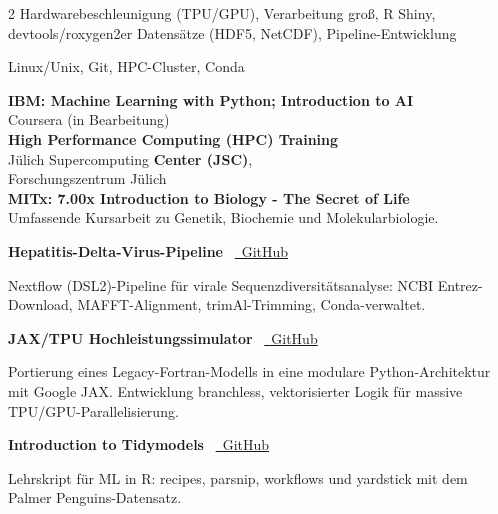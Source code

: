 \documentclass{thejus_cv}
\begin{document}
\begin{paracol}{2}
         {Hardwarebeschleunigung (TPU/GPU), Verarbeitung gro{\ss, R Shiny, devtools/roxygen2}er Datens\"atze (HDF5, NetCDF), Pipeline-Entwicklung}

         {Linux/Unix, Git, HPC-Cluster, Conda}



\textbf{IBM: Machine Learning with Python; Introduction to AI}\\
{\small Coursera (in Bearbeitung)}\\[0.3cm]

\textbf{High Performance Computing (HPC) Training}\\
J\"ulich Supercomputing \textbf{Center (JSC)},\\
Forschungszentrum J\"ulich\\[0.3cm]

\textbf{MITx: 7.00x Introduction to Biology - The Secret of Life}\\
{\small Umfassende Kursarbeit zu Genetik, Biochemie und Molekularbiologie.}\\[0.4cm]


\textbf{Hepatitis-Delta-Virus-Pipeline} \textbullet\ \href{https://github.com/thejusmahajan/hepatitis-delta-pipeline}{\faGithub\ GitHub}\par
{\small Nextflow (DSL2)-Pipeline f\"ur virale Sequenzdiversit\"atsanalyse: NCBI Entrez-Download, MAFFT-Alignment, trimAl-Trimming, Conda-verwaltet.}\par
\vspace{0.3em}

\textbf{JAX/TPU Hochleistungssimulator} \textbullet\ \href{https://github.com/thejusmahajan/Agent_Based_Phytoplankton_Model-IBM-Phytoplankton}{\faGithub\ GitHub}\par
{\small Portierung eines Legacy-Fortran-Modells in eine modulare Python-Architektur mit Google JAX. Entwicklung branchless, vektorisierter Logik f\"ur massive TPU/GPU-Parallelisierung.}\par
\vspace{0.3em}

\textbf{Introduction to Tidymodels} \textbullet\ \href{https://github.com/thejusmahajan/Introduction_to_Tidymodels}{\faGithub\ GitHub}\par
{\small Lehrskript f\"ur ML in R: recipes, parsnip, workflows und yardstick mit dem Palmer Penguins-Datensatz.}\par
\vspace{0.3em}


\end{paracol}
\end{document}

